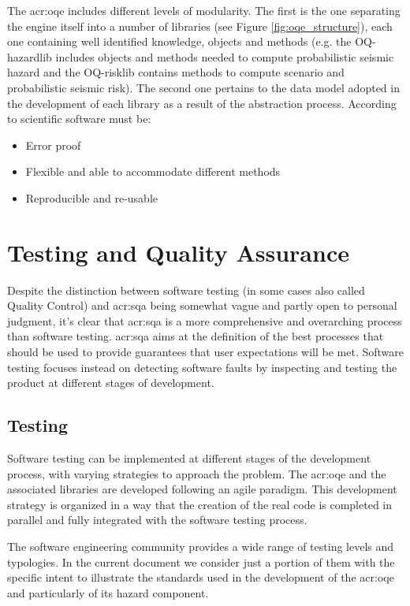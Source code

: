 %
The \gls{acr:oqe} includes different levels of modularity. 
The first is the one separating the engine itself into a number of 
libraries (see Figure \ref{fig:oqe_structure}), each one containing well 
identified knowledge, objects and methods (e.g. the OQ-hazardlib  
includes objects and methods needed to compute probabilistic 
seismic hazard and the OQ-risklib contains methods to compute scenario 
and probabilistic seismic risk).
%
The second one pertains to the data model adopted in the development 
of each library as a result of the abstraction process.
%
According to \textcite{berkes2012} scientific software must be:
\begin{itemize}
\item Error proof
\item Flexible and able to accommodate different methods
\item Reproducible and re-usable
\end{itemize}
%
\section{Testing and Quality Assurance}
Despite the distinction between software testing (in some cases also called 
Quality Control) and \gls{acr:sqa} being somewhat vague and partly open to personal 
judgment, it's clear that \gls{acr:sqa} is a more comprehensive and 
overarching process than software testing.
%
\gls{acr:sqa} aims at the definition of the best processes  
that should be used to provide guarantees that user expectations will 
be met.
%
Software testing focuses instead on detecting software faults by inspecting 
and testing the product at different stages of development.
%
\subsection{Testing}
Software testing can be implemented at different stages of the development 
process, with varying strategies to approach the problem.
%
The \gls{acr:oqe} and the associated libraries are developed following an 
agile paradigm. This development strategy is organized in a way that 
the creation of the real code is completed in parallel and fully 
integrated with the software testing process.

The software engineering community provides a wide range of testing levels
and typologies. In the current document we consider just a portion of them
with the specific intent to illustrate the standards used in the 
development of the \gls{acr:oqe} and particularly of its hazard component.
%
